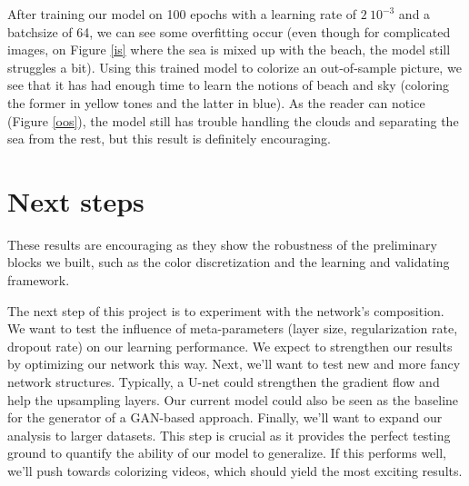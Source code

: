 \documentclass[10pt,twocolumn,letterpaper]{article}
\begin{document}
After training our model on 100 epochs with a learning rate of $2~10^{-3}$ and a batchsize of 64, we can see some overfitting occur (even though for complicated images, \eg on Figure \ref{is} where the sea is mixed up with the beach, the model still struggles a bit).
Using this trained model to colorize an out-of-sample picture, we see that it has had enough time to learn the notions of beach and sky (coloring the former in yellow tones and the latter in blue). As the reader can notice (Figure \ref{oos}), the model still has trouble handling the clouds and separating the sea from the rest, but this result is definitely encouraging.

\section{Next steps}

%

These results are encouraging as they show the robustness of the preliminary blocks we built, such as the color discretization and the learning and validating framework.

The next step of this project is to experiment with the network's composition. We want to test the influence of meta-parameters (layer size, regularization rate, dropout rate) on our learning performance. We expect to strengthen our results by optimizing our network this way. Next, we'll want to test new and more fancy network structures. Typically, a U-net could strengthen the gradient flow and help the upsampling layers. Our current model could also be seen as the baseline for the generator of a GAN-based approach.
Finally, we'll want to expand our analysis to larger datasets. This step is crucial as it provides the perfect testing ground to quantify the ability of our model to generalize. If this performs well, we'll push towards colorizing videos, which should yield the most exciting results.

{\small


}
\end{document}
